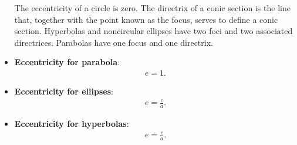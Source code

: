 \documentclass{report}
\begin{document}
\begin{itemize}
\begin{itemize}
    \end{itemize}
    The eccentricity of a circle is zero. The directrix of a conic section is the line that, together with the point known as the focus, serves to define a conic section. Hyperbolas and noncircular ellipses have two foci and two associated directrices. Parabolas have one focus and one directrix.
    \bigbreak \noindent 
    \item \textbf{Eccentricity for parabola}:
        \begin{align*}
            e=1
        .\end{align*}
    \item \textbf{Eccentricity for ellipses}:
        \begin{align*}
            e = \frac{c}{a}
        .\end{align*}
    \item \textbf{Eccentricity for hyperbolas}:
        \begin{align*}
            e = \frac{c}{a}
        .\end{align*}

    \end{itemize}
    \bigbreak \noindent 
\end{document}
